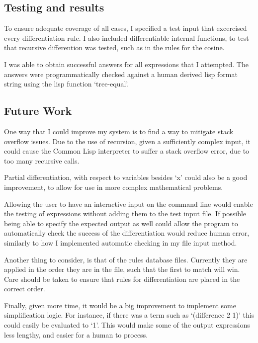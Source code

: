 \documentclass[letterpaper]{article}
\begin{document}
\subsection{Testing and results}
To ensure adequate coverage of all cases, I specified a test input that excercised
every differentiation rule. I also included differentiable internal functions,
to test that recursive differention was tested, such as in the rules for the cosine.

I was able to obtain successful answers for all expressions that I attempted. The
answers were programmatically checked against a human derived lisp format string
using the lisp function `tree-equal'.


\subsection{Future Work}
One way that I could improve my system is to find a way to mitigate stack overflow issues.
Due to the use of recursion, given a sufficiently complex input, it could cause the
Common Lisp interpreter to suffer a stack overflow error, due to too many recursive calls.

Partial differentiation, with respect to variables besides `x' could also be a good improvement,
to allow for use in more complex mathematical problems.

Allowing the user to have an interactive input on the command line would enable the testing of
expressions without adding them to the test input file. If possible being able to 
specify the expected output as well could allow the program to automatically check
the success of the differentiation would reduce human error, similarly to how I implemented
automatic checking in my file input method.

Another thing to consider, is that of the rules database files. Currently they are applied
in the order they are in the file, such that the first to match will win. Care should be 
taken to ensure that rules for differentiation are placed in the correct order.

Finally, given more time, it would be a big improvement to implement some simplification logic.
For instance, if there was a term such as `(difference 2 1)' this could easily be
evaluated to `1'. This would make some of the output expressions less lengthy, and 
easier for a human to process.

\onecolumn
\end{document}
